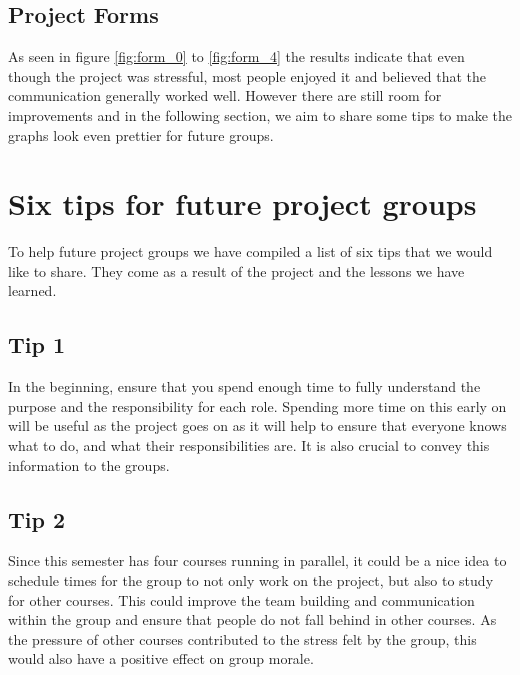 \documentclass{article}
\begin{document}
    \subsection{Project Forms}
        As seen in figure \ref{fig:form_0} to \ref{fig:form_4} the results indicate
        that even though the project was stressful, most people enjoyed it and believed that
        the communication generally worked well. However there are still room for improvements
        and in the following section, we aim to share some tips to make the graphs look even prettier
        for future groups.


\section{Six tips for future project groups \label{tips}}

    To help future project groups we have compiled a list of six tips that we would like to share.
    They come as a result of the project and the lessons we have learned.
    
    \subsection{Tip 1}
        In the beginning, ensure that you spend enough time to fully understand the purpose and the
        responsibility for each role. Spending more time on this early on will be useful as the project
        goes on as it will help to ensure that everyone knows what to do, and what their responsibilities are. It is also crucial
        to convey this information to the groups.
        
    \subsection{Tip 2}
        Since this semester has four courses running in parallel, it could be a nice idea
        to schedule times for the group to not only work on the project, but also to study
        for other courses. This could improve the team building and communication within the
        group and ensure that people do not fall behind in other courses. As the pressure of other
        courses contributed to the stress felt by the group, this would also have a positive effect on group morale.
    
\end{document}

